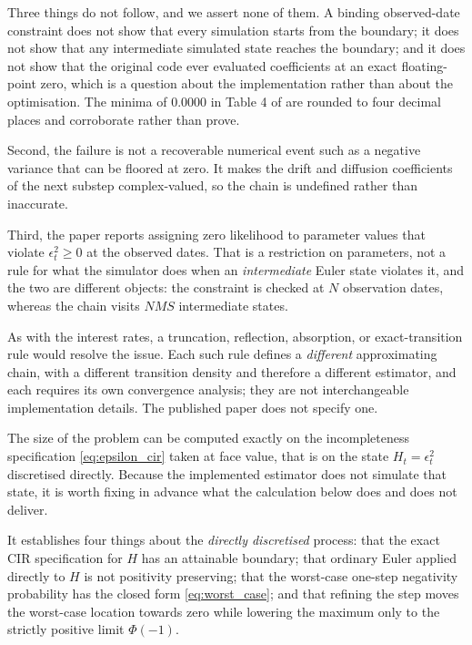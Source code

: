 \documentclass[11pt]{article}
\theoremstyle{definition}
\begin{document}
Three things do not follow, and we assert none of them. A binding observed-date constraint does not show that every simulation starts from the boundary; it does not show that any intermediate simulated state reaches the boundary; and it does not show that the original code ever evaluated coefficients at an exact floating-point zero, which is a question about the implementation rather than about the optimisation. The minima of $0.0000$ in Table 4 of \citet{BrandtSantaClara2002} are rounded to four decimal places and corroborate rather than prove.

Second, the failure is not a recoverable numerical event such as a negative variance that can be floored at zero. It makes the drift and diffusion coefficients of the next substep complex-valued, so the chain is undefined rather than inaccurate.

Third, the paper reports assigning zero likelihood to parameter values that violate $\epsilon_t^2\ge0$ at the observed dates. That is a restriction on parameters, not a rule for what the simulator does when an \emph{intermediate} Euler state violates it, and the two are different objects: the constraint is checked at $N$ observation dates, whereas the chain visits $NMS$ intermediate states.

As with the interest rates, a truncation, reflection, absorption, or exact-transition rule would resolve the issue. Each such rule defines a \emph{different} approximating chain, with a different transition density and therefore a different estimator, and each requires its own convergence analysis; they are not interchangeable implementation details. The published paper does not specify one.

The size of the problem can be computed exactly on the incompleteness specification \eqref{eq:epsilon_cir} taken at face value, that is on the state $H_t=\epsilon_t^2$ discretised directly. Because the implemented estimator does not simulate that state, it is worth fixing in advance what the calculation below does and does not deliver.

It establishes four things about the \emph{directly discretised} process: that the exact CIR specification for $H$ has an attainable boundary; that ordinary Euler applied directly to $H$ is not positivity preserving; that the worst-case one-step negativity probability has the closed form \eqref{eq:worst_case}; and that refining the step moves the worst-case location towards zero while lowering the maximum only to the strictly positive limit $\Phi(-1)$.
\end{document}
